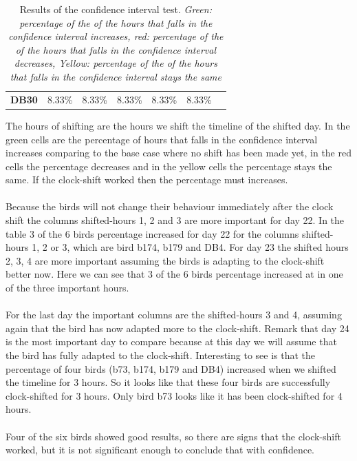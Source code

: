 \documentclass[a4paper]{article}
\begin{document}
\begin{table}[H]
{\begin{tabular}{|l|l|l|l|l|l|lllll}
\textbf{DB30} & \cellcolor[HTML]{BBDAFF}8.33\% & \cellcolor[HTML]{FFFE65}8.33\% & \cellcolor[HTML]{FFFE65}8.33\% & \cellcolor[HTML]{FFFE65}8.33\% & \cellcolor[HTML]{FFFE65}8.33\% & \multicolumn{5}{l}{\multirow{}{}{\cellcolor[HTML]{FFFFFF}}} \\ \cline{1-6}
\end{tabular}
}
\caption{Results of the confidence interval test. \small{\emph{Green: percentage of the of the hours that falls in the confidence interval increases, 
red: percentage of the of the hours that falls in the confidence interval decreases, Yellow: percentage of the of the hours that falls in the confidence interval stays the same }}}
\label{my-label}
\end{table}
The hours of shifting are the hours we shift the timeline of the shifted day. In the green cells are the percentage of hours that falls in the confidence interval increases comparing to the base case where no shift has been made yet, in the red cells the percentage decreases and in the yellow cells the percentage stays the same. If the clock-shift worked then the percentage must increases.\\\\
Because the birds will not change their behaviour immediately after the clock shift the columns shifted-hours 1, 2 and 3 are more important for day 22. In the table 3 of the 6 birds percentage increased for day 22 for the columns shifted-hours 1, 2 or 3, which are bird b174, b179 and DB4. For day 23 the shifted hours 2, 3, 4 are more important assuming the birds is adapting  to the clock-shift better now. Here we can see that 3 of the 6 birds percentage increased at in one of the three important hours.\\\\For the last day the important columns are the shifted-hours 3 and 4, assuming again that the bird has now adapted more to the clock-shift. Remark that day 24 is the most important day to compare because at this day we will assume that the bird has fully adapted to the clock-shift. Interesting to see is that the percentage of four birds (b73, b174, b179 and DB4) increased when we shifted the timeline for 3 hours. So it looks like that these four birds are successfully clock-shifted for 3 hours. Only bird b73 looks like it has been clock-shifted for 4 hours.\\\\
Four of the six birds showed good results, so there are signs that the clock-shift worked, but it is not significant enough to conclude that with confidence. 
\end{document}
